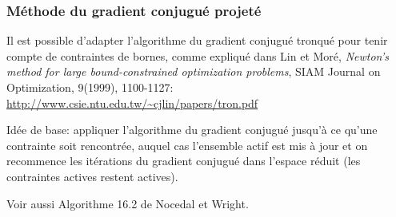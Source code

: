 \documentclass[t,usepdftitle=false]{beamer}
\begin{document}
\begin{frame}
	\frametitle{Méthode du gradient conjugué projeté}
	
	Il est possible d'adapter l'algorithme du gradient conjugué tronqué pour tenir compte de contraintes de bornes, comme expliqué dans Lin et Moré, {\sl Newton's method for large bound-constrained optimization problems}, SIAM Journal on Optimization, 9(1999), 1100-1127: \url{http://www.csie.ntu.edu.tw/~cjlin/papers/tron.pdf}
	
	\mbox{}
	
	Idée de base: appliquer l'algorithme du gradient conjugué jusqu'à ce qu'une contrainte soit rencontrée, auquel cas l'ensemble actif est mis à jour et on recommence les itérations du gradient conjugué dans l'espace réduit (les contraintes actives restent actives).
	
	\mbox{}
	
	Voir aussi Algorithme 16.2 de Nocedal et Wright.
	
\end{frame}
\end{document}
